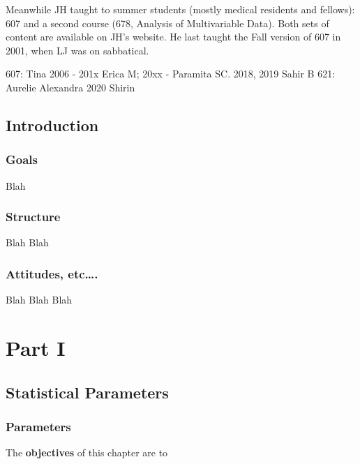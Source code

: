 \documentclass[]{book}
\begin{document}
Meanwhile JH taught to summer students (mostly medical residents and fellows): 607 and a second course (678, Analysis of Multivariable Data). Both sets of content are available on JH's website. He last taught the Fall version of 607 in 2001, when LJ was on sabbatical.

607: Tina 2006 - 201x Erica M; 20xx - Paramita SC. 2018, 2019 Sahir B
621: Aurelie Alexandra 2020 Shirin

\hypertarget{introduction}{%
\chapter{Introduction}\label{introduction}}

\hypertarget{goals}{%
\section{Goals}\label{goals}}

Blah

\hypertarget{structure}{%
\section{Structure}\label{structure}}

Blah Blah

\hypertarget{attitudes-etc.}{%
\section{Attitudes, etc\ldots{}.}\label{attitudes-etc.}}

Blah Blah Blah

\hypertarget{part-part-i}{%
\part{Part I}\label{part-part-i}}

\hypertarget{paras}{%
\chapter{Statistical Parameters}\label{paras}}

\hypertarget{parameters}{%
\section{Parameters}\label{parameters}}

The \textbf{objectives} of this chapter are to
\end{document}
